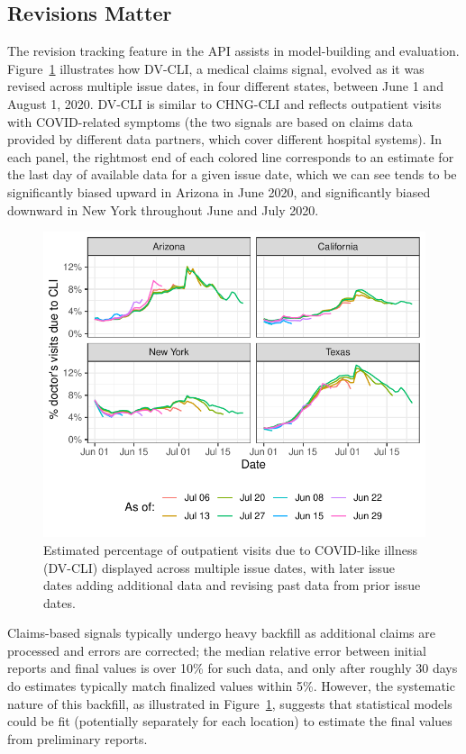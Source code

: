 \documentclass[9pt,twocolumn,twoside,lineno]{pnas-new}
\begin{document}
\subsection{Revisions Matter}

The revision tracking feature in the API assists in model-building and
evaluation. Figure~\ref{fig:dv_as_of} illustrates how DV-CLI, a medical claims
signal, evolved as it was revised across multiple issue dates, in four different
states, between June 1 and August 1, 2020. DV-CLI is similar to CHNG-CLI and
reflects outpatient visits with COVID-related symptoms (the two signals are
based on claims data provided by different data partners, which cover different
hospital systems). In each panel, the rightmost end of each colored line
corresponds to an estimate for the last day of available data for a given issue
date, which we can see tends to be significantly biased upward in Arizona in
June 2020, and significantly biased downward in New York throughout June and
July 2020.

\begin{figure}[t]
  \includegraphics[width=\columnwidth]{fig/dv_as_of.pdf}
  \caption{Estimated percentage of outpatient visits due to COVID-like illness 
    (DV-CLI) displayed across multiple issue dates, with later issue dates
    adding additional data and revising past data from prior issue dates.}
  \label{fig:dv_as_of}
\end{figure}

Claims-based signals typically undergo heavy backfill as additional claims are
processed and errors are corrected; the median relative error between initial
reports and final values is over 10\% for such data, and only after roughly 30
days do estimates typically match finalized values within 5\%. However, the
systematic nature of this backfill, as illustrated in Figure~\ref{fig:dv_as_of},
suggests that statistical models could be fit (potentially separately for each
location) to estimate the final values from preliminary reports.
\end{document}
